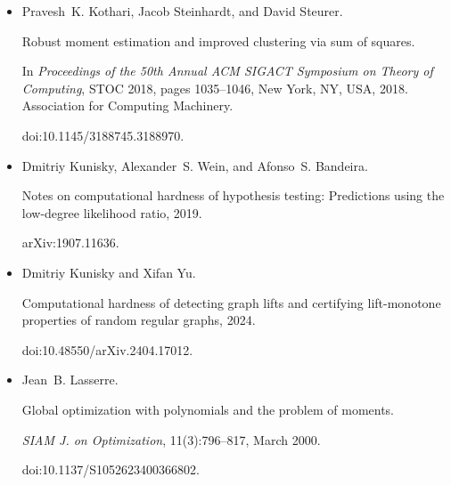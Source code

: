 \begin{itemize}
Pravesh K. Kothari, Aaron Potechin, and Jeff Xu.


Sum-of-squares lower bounds for independent set on ultra-sparse
random graphs.


In \emph{Proceedings of the 56th Annual ACM Symposium on Theory of
Computing}, STOC 2024, pages 1923–1934, New York, NY, USA, 2024. Association
for Computing Machinery.


doi:10.1145/3618260.3649703.





\item[] 
[30]

Pravesh K. Kothari, Jacob Steinhardt, and David Steurer.


Robust moment estimation and improved clustering via sum of squares.


In \emph{Proceedings of the 50th Annual ACM SIGACT Symposium on Theory
of Computing}, STOC 2018, pages 1035–1046, New York, NY, USA, 2018.
Association for Computing Machinery.


doi:10.1145/3188745.3188970.





\item[] 
[31]

Dmitriy Kunisky, Alexander S. Wein, and Afonso S. Bandeira.


Notes on computational hardness of hypothesis testing: Predictions
using the low-degree likelihood ratio, 2019.


arXiv:1907.11636.





\item[] 
[32]

Dmitriy Kunisky and Xifan Yu.


Computational hardness of detecting graph lifts and certifying
lift-monotone properties of random regular graphs, 2024.


doi:10.48550/arXiv.2404.17012.





\item[] 
[33]

Jean B. Lasserre.


Global optimization with polynomials and the problem of moments.


\emph{SIAM J. on Optimization}, 11(3):796–817, March 2000.


doi:10.1137/S1052623400366802.






\end{itemize}
